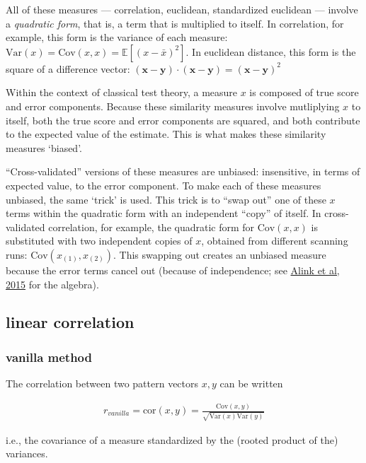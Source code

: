\documentclass{article}\usepackage[]{graphicx}\usepackage[]{color}
\begin{document}
All of these measures --- correlation, euclidean, standardized euclidean --- involve a \textit{quadratic form}, that is, a term that is multiplied to itself.
In correlation, for example, this form is the variance of each measure: $\text{Var}(x) = \text{Cov}(x, x) = \mathbb{E}[(x - \bar{x})^2]$.
In euclidean distance, this form is the square of a difference vector: $(\mathbf{x} - \mathbf{y}) \cdot (\mathbf{x} - \mathbf{y}) = (\mathbf{x} - \mathbf{y})^2$

Within the context of classical test theory, a measure $x$ is composed of true score and error components.
Because these similarity measures involve mutliplying $x$ to itself, both the true score and error components are squared, and both contribute to the expected value of the estimate.
This is what makes these similarity measures `biased'.

``Cross-validated'' versions of these measures are unbiased: insensitive, in terms of expected value, to the error component.
To make each of these measures unbiased, the same `trick' is used.
This trick is to ``swap out'' one of these $x$ terms within the quadratic form with an independent ``copy'' of itself.
In cross-validated correlation, for example, the quadratic form for $\text{Cov}(x, x)$ is substituted with two independent copies of $x$, obtained from different scanning runs: $\text{Cov}(x_{(1)}, x_{(2)})$.
This swapping out creates an unbiased measure because the error terms cancel out (because of independence; see \href{https://www.biorxiv.org/content/10.1101/032391v2}{Alink et al, 2015} for the algebra).


\subsection*{linear correlation}

\subsubsection*{vanilla method}

The correlation between two pattern vectors $x, y$ can be written

\begin{align*}
  r_\textit{vanilla} = \text{cor}(x, y) = \frac
  {\text{Cov}(x, y)}
  {\sqrt{\text{Var}(x)\text{Var}(y)}}
\end{align*}

i.e., the covariance of a measure standardized by the (rooted product of the) variances.
\end{document}
